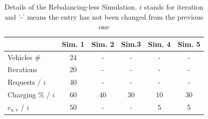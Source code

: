\begin{table}[h]
		\centering
		\begin{tabular}{ |l| c|c|c|c|c|}
			\hline
			&Sim. 1 & Sim. 2& Sim.3&Sim. 4&Sim. 5 \\
			\hline
			Vehicles \#& 24&-&- &-&-\\
			Iterations & 20&-&-&-&-\\
			Requests / $i$ & 40&-&-&-&-\\
			Charging \% / $i$ & 60&40&30&10&30\\
			$c_{u,v}$  / $i$ & 50&-&-&5&5\\
		\end{tabular}
		\caption[Details of the Rebalancing-less Simulation]{Details of the Rebalancing-less Simulation. $i$ stands for iteration and '-' means the entry has not been changed from the previous one}
		\label{tab:routingless_simu_details}   
\end{table} 

